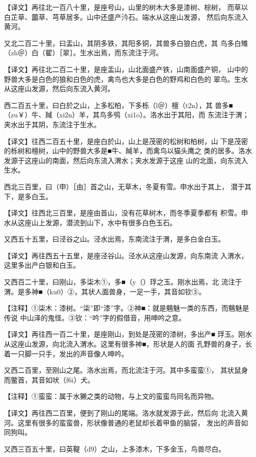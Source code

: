 \documentclass[a4paper,12pt,UTF8,twoside]{ctexbook}
\begin{document}
【译文】再往北一百八十里，是座号山，山里的树木大多是漆树、棕树， 而草以白芷草、虈草、芎草居多。山中还盛产汵石。端水从这座山发源， 然后向东流入黄河。

又北二百二十里，曰盂山，其阴多铁，其阳多铜，其兽多白狼白虎，其 鸟多白雉（zh＠）白（翟）［翠］。生水出焉，而东流注于河。

【译文】再往北二百二十里，是座盂山，山北面盛产铁，山南面盛产铜， 山中的野兽大多是白色的狼和白色的虎，禽鸟也大多是白色的野鸡和白色的 翠鸟。生水从这座山发源，然后向东流入黄河。

西二百五十里，曰白於之山，上多松柏，下多栎（l＠）檀（t2n），其 兽多■（zu￥）牛、羬（xi2n）羊，其鸟多鸮（xi1o）。洛水出于其阳，而 东流注于渭；夹水出于其阴，东流注于生水。

【译文】往西二百五十里，是座白於山，山上是茂密的松树和柏树，山 下是茂密的栎树和檀树，山中的野兽大多是■牛、羬羊，而禽鸟以猫头鹰之 类的居多。洛水发源于这座山的南面，然后向东流入渭水；夹水发源于这座 山的北面，向东流入生水。

西北三百里，曰（申）［由］首之山，无草木，冬夏有雪。申水出于其上， 潜于其下，是多白玉。

【译文】往西北三百里，是座由首山，没有花草树木，而冬季夏季都有 积雪。申水从这座山上发源，潜流到山下，水中有很多白色玉石。

又西五十五里，曰泾谷之山。泾水出焉，东南流注于渭，是多白金白玉。

【译文】再往西五十五里，是座泾谷山。泾水从这座山发源，向东南流 入渭水，这里多出产白银和白玉。

又西百二十里，曰刚山，多柒木①，多■（y（）琈之玉。刚水出焉，北 流注于渭。是多神■（ku0）②，其状人面兽身，一足一手，其音如钦③。

【注释】①柒木：漆树。“柒”即“漆”字。②神■：就是魑魅一类的东西，而魑魅是传说 中山泽的鬼怪。③钦：“吟”字的假借音，用呻吟之意。

【译文】再往西一百二十里，是座刚山，到处是茂密的漆树，多出产■ 琈玉。刚水从这座山发源，向北流入渭水。这里有很多神■，形状是人的面 孔野兽的身子，长着一只脚一只手，发出的声音像人呻吟。

又西二百里，至刚山之尾。洛水出焉，而北流注于河。其中多蛮蛮①， 其状鼠身而鳖首，其音如吠（f6i）犬。

【注释】①蛮蛮：属于水獭之类的动物，与上文的蛮蛮鸟同名而异物。

【译文】再往西二百里，便到了刚山的尾端。洛水就发源于此，然后向 北流入黄河。这里有很多的蛮蛮兽，形状像普通的老鼠却长着甲鱼的脑袋， 发出的声音如同狗叫。

又西三百五十里，曰英鞮（d9）之山，上多漆木，下多金玉，鸟兽尽白。
\end{document}
